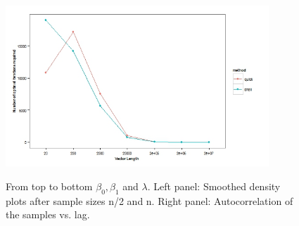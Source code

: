 \documentclass[12pt]{article}
\begin{document}
\begin{enumerate}[label=(\alph*)]
\begin{figure}[H]
\end{figure}
\begin{figure}
\centering
{\includegraphics[width=3.9in]{fig3.jpeg}}
\caption{From top to bottom $\beta_0,\beta_1 $ and $\lambda$. Left panel: Smoothed density plots after sample sizes n/2 and n. Right panel: Autocorrelation of the samples vs. lag.}
\end{figure}

\end{enumerate}
\end{document}
